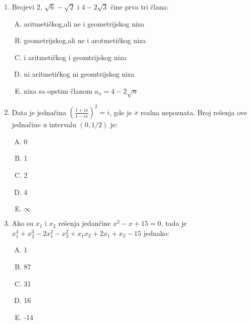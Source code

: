 \documentclass[a4paper,12pt]{report}
\begin{document}
\begin{enumerate}[1.]
\item Brojevi 2, $\sqrt{6} - \sqrt{2} $ i $4 - 2\sqrt{3}$ \v{c}ine prva tri \v{c}lana:
\begin{enumerate}[A)]
\item aritmeti\v{c}kog,ali ne i geometrijskog niza 
\item geometrijskog,ali ne i arotmeti\v{c}kog niza
\item i aritmeti\v{c}kog i geomtrijskog niza
\item ni aritmeti\v{c}kog ni geomtrijskog niza
\item niza sa opstim \v{c}lanom $a_n = 4 - 2\sqrt{n} $
\end{enumerate}

\item Data je jedna\v{c}ina $(\frac{1 + ix}{1 - ix})^2 = i $, gde je $x$ realna nepoznata. Broj re\v{s}enja ove jedna\v{c}ine u intervalu $(0,1/2)$ je:
\begin{multicols}{5}
\begin{enumerate}[A)]
\item 0 \item 1 \item 2 \item 4 \item $\infty$
\end{enumerate}
\end{multicols}

\item Ako su $x_1$ i $x_2$ re\v{s}enja jedan\v{c}ine $x^2 - x + 15 = 0$, tada je $x_1^3 + x_2^3 - 2x_1^2 - x_2^2 + x_1x_2 + 2x_1 + x_2 -15 $ jednako:
\begin{multicols}{5}
\begin{enumerate}[A)]
\item 1 \item 87 \item 31 \item 16 \item -14
\end{enumerate}
\end{multicols}




\end{enumerate}







\end{document}
